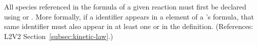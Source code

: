 All species referenced in the \KineticLaw formula of a given reaction must
first be declared using \SpeciesReference or \ModifierSpeciesReference.
More formally, if a \Species identifier appears in a  element of
a \Reaction's \KineticLaw formula, that same identifier must also appear in
at least one \SpeciesReference or \ModifierSpeciesReference in the
\Reaction definition.  (References: L2V2 Section~\ref{subsec:kinetic-law}.)
